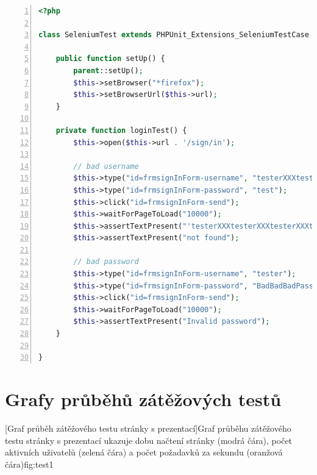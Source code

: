 \documentclass[11pt,twoside,a4paper]{book}
\begin{document}
\newpage

\begin{lstlisting}[caption={Ukázka Selenium testu},label={lst:seleniumtest},
language=php,
numbers=left,
breaklines=true]
<?php

class SeleniumTest extends PHPUnit_Extensions_SeleniumTestCase {

	public function setUp() {
		parent::setUp();
		$this->setBrowser("*firefox");
		$this->setBrowserUrl($this->url);
	}

	private function loginTest() {
		$this->open($this->url . '/sign/in');

		// bad username
		$this->type("id=frmsignInForm-username", "testerXXXtesterXXXtesterXXXtester");
		$this->type("id=frmsignInForm-password", "test");
		$this->click("id=frmsignInForm-send");
		$this->waitForPageToLoad("10000");
		$this->assertTextPresent("'testerXXXtesterXXXtesterXXXtester'");
		$this->assertTextPresent("not found");

		// bad password
		$this->type("id=frmsignInForm-username", "tester");
		$this->type("id=frmsignInForm-password", "BadBadBadPassword");
		$this->click("id=frmsignInForm-send");
		$this->waitForPageToLoad("10000");
		$this->assertTextPresent("Invalid password");
	}
	
}
\end{lstlisting}

\chapter{Grafy průběhů zátěžových testů}\label{chap:loadtest}

%
[Graf průběh zátěžového testu stránky s prezentací]{Graf průběhu zátěžového testu stránky s prezentací ukazuje dobu načtení stránky (modrá čára), počet aktivních uživatelů (zelená čára) a počet požadavků za sekundu (oranžová čára)}{fig:test1}
\end{document}

